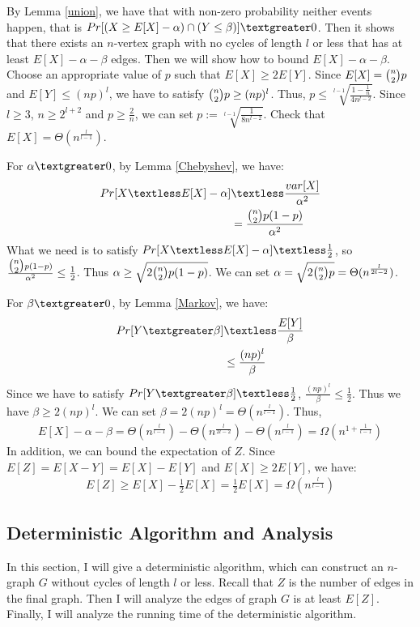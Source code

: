 By Lemma \ref{union}, we have that with non-zero probability neither events happen, that is $Pr[(X\ge E[X]-\alpha)\cap (Y \le \beta)]\textgreater 0$. Then it shows that there exists an $n$-vertex graph with no cycles of length $l$ or less that has at least $E[X]-\alpha-\beta$ edges. 
Then we will show how to bound $E[X]-\alpha-\beta$.
Choose an appropriate value of $p$ such that $E[X] \ge 2E[Y]$. Since $E[X]=\tbinom{n}{2}p$ and $E[Y]\le (np)^l$, we have to satisfy $\tbinom{n}{2}p \ge (np)^l$. Thus, $p\le  \sqrt[l-1]{\frac{1-\frac{1}{n}}{4n^{l-2}}}$. Since $l\ge 3$, $n\ge 2^{l+2}$ and $p\ge \frac{2}{n}$, we can set $p:=\sqrt[l-1]{\frac{1}{8n^{l-2}}}$. Check that $E[X]=\Theta (n^\frac{l}{l-1})$.%

For $\alpha \textgreater 0$, by Lemma \ref{Chebyshev}, we have:
\begin{align}
    \nonumber Pr[X\textless E[X]-\alpha] &\textless \frac{var[X]}{\alpha^2}\\
    \nonumber &=\frac{\tbinom{n}{2}p(1-p)}{\alpha^2}
\end{align}
What we need is to satisfy $Pr[X\textless E[X]-\alpha] \textless \frac{1}{2}$, so $\frac{\tbinom{n}{2}p(1-p)}{\alpha^2}\le \frac{1}{2} $. Thus $\alpha \ge \sqrt{2\tbinom{n}{2}p(1-p)}$. We can set $\alpha = \sqrt{2\tbinom{n}{2}p}=\Theta(n^{\frac{l}{2l-2}})$.

For $\beta \textgreater 0$, by Lemma \ref{Markov}, we have: 
\begin{align}
    \nonumber Pr[Y \textgreater \beta] &\textless \frac{E[Y]}{\beta}\\
    \nonumber & \le \frac{(np)^l}{\beta} 
\end{align}
Since we have to satisfy $Pr[Y \textgreater \beta]\textless \frac{1}{2}$, $\frac{(np)^l}{\beta} \le \frac{1}{2}$. Thus we have $\beta \ge 2(np)^l$. We can set $\beta = 2(np)^l = \Theta (n^{\frac{l}{l-1}})$.
Thus,
\begin{align}
    \nonumber E[X]-\alpha-\beta = \Theta (n^\frac{l}{l-1}) - \Theta(n^{\frac{l}{2l-2}}) - \Theta (n^{\frac{l}{l-1}})=\Omega (n^{1+\frac{1}{l-1}})
\end{align}
In addition, we can bound the expectation of $Z$.
Since $E[Z]=E[X-Y]=E[X]-E[Y]$ and $E[X]\ge 2E[Y]$, we have:
\begin{align}
    \nonumber E[Z]\ge E[X]-\frac{1}{2}E[X]=\frac{1}{2}E[X]=\Omega (n^\frac{l}{l-1})
\end{align}
\subsection{Deterministic Algorithm and Analysis}
In this section, I will give a deterministic algorithm, which can construct an $n$-graph $G$ without cycles of length $l$ or less. 
Recall that $Z$ is the number of edges in the final graph.
Then I will analyze the edges of graph $G$ is at least $E[Z]$. 
Finally, I will analyze the running time of the deterministic algorithm.
